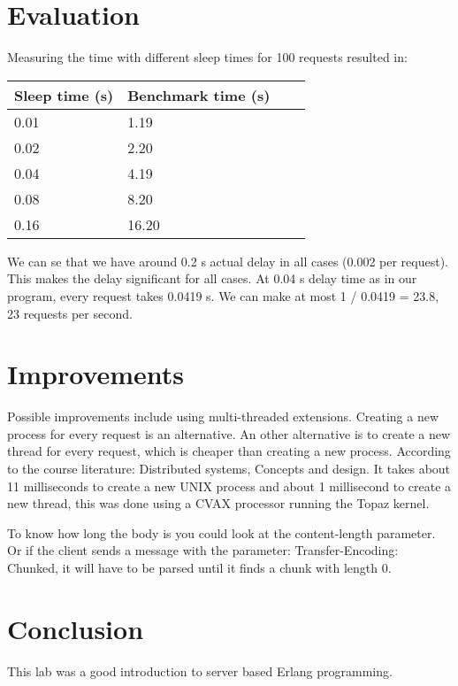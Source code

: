 \documentclass[a4paper]{article}
\begin{document}
\section{Evaluation}
Measuring the time with different sleep times for 100 requests resulted in:

\begin{center}
    \begin{tabular}{| l | l | l | l |}
    \hline
    Sleep time (s) & Benchmark time (s) \\ \hline
    0.01 & 1.19 \\ \hline
    0.02 & 2.20 \\ \hline
    0.04 & 4.19 \\ \hline
    0.08 & 8.20 \\ \hline
    0.16 & 16.20 \\
    \hline
    \end{tabular}
\end{center}

We can se that we have around 0.2 s actual delay in all cases (0.002 per request). This makes the delay significant for all cases. At 0.04 s delay time as in our program, every request takes 0.0419 s. We can make at most 1 / 0.0419 = 23.8, 23 requests per second.

\section{Improvements}
Possible improvements  include using multi-threaded extensions. Creating a new process for every request is an alternative. An other alternative is to create a new thread for every request, which is cheaper than creating a new process. According to the course literature: Distributed systems, Concepts and design. It takes about 11 milliseconds to create a new UNIX process and about 1 millisecond to create a new thread, this was done using a CVAX processor running the Topaz kernel.

To know how long the body is you could look at the content-length parameter. Or if the client sends a message with the parameter: Transfer-Encoding: Chunked, it will have to be parsed until it finds a chunk with length 0.

\section{Conclusion}
This lab was a good introduction to server based Erlang programming.
\end{document}
